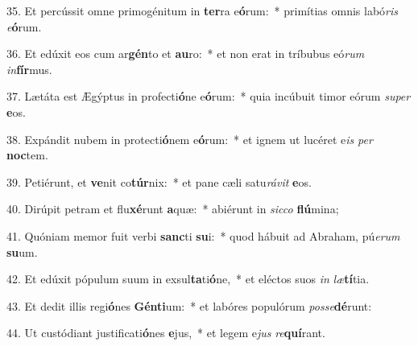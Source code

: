 35. Et percússit omne primogénitum in \textbf{ter}ra e\textbf{ó}rum:~*  primítias omnis labó\textit{ris} \textit{e}\textbf{ó}rum.\

36. Et edúxit eos cum ar\textbf{gén}to et \textbf{au}ro:~*  et non erat in tríbubus eó\textit{rum} \textit{in}\textbf{fír}mus.\

37. Lætáta est Ægýptus in profecti\textbf{ó}ne e\textbf{ó}rum:~*  quia incúbuit timor eórum \textit{su}\textit{per} \textbf{e}os.\

38. Expándit nubem in protecti\textbf{ó}nem e\textbf{ó}rum:~*  et ignem ut lucéret e\textit{is} \textit{per} \textbf{noc}tem.\

39. Petiérunt, et \textbf{ve}nit co\textbf{túr}nix:~*  et pane cæli satu\textit{rá}\textit{vit} \textbf{e}os.\

40. Dirúpit petram et flu\textbf{xé}runt \textbf{a}quæ:~*  abiérunt in \textit{sic}\textit{co} \textbf{flú}mina;\

41. Quóniam memor fuit verbi \textbf{sanc}ti \textbf{su}i:~*  quod hábuit ad Abraham, pú\textit{e}\textit{rum} \textbf{su}um.\

42. Et edúxit pópulum suum in exsul\textbf{ta}ti\textbf{ó}ne,~*  et eléctos suos \textit{in} \textit{læ}\textbf{tí}tia.\

43. Et dedit illis regi\textbf{ó}nes \textbf{Gén}\textbf{ti}um:~*  et labóres populórum \textit{pos}\textit{se}\textbf{dé}runt:\

44. Ut custódiant justificati\textbf{ó}nes \textbf{e}jus,~*  et legem e\textit{jus} \textit{re}\textbf{quí}rant.\

